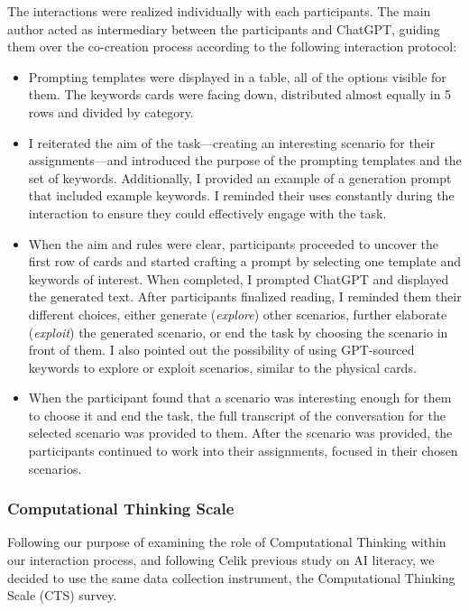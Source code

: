 \documentclass[sn-mathphys, Numbered]{sn-jnl}%
\theoremstyle{thmstyleone}%
\theoremstyle{thmstyletwo}%
\theoremstyle{thmstylethree}%
\begin{document}
The interactions were realized individually with each participants. The main author acted as intermediary between the participants and ChatGPT, guiding them over the co-creation process according to the following interaction protocol:
    \begin{itemize}

        \item  Prompting templates were displayed in a table, all of the options visible for them. The keywords cards were facing down, distributed almost equally in 5 rows and divided by category.
        \item I reiterated the aim of the task---creating an interesting scenario for their assignments---and introduced the purpose of the prompting templates and the set of keywords. Additionally, I provided an example of a generation prompt that included example keywords. I reminded their uses constantly during the interaction to ensure they could effectively engage with the task.
        \item When the aim and rules were clear, participants proceeded to uncover the first row of cards and started crafting a prompt by selecting one template and keywords of interest. When completed, I prompted ChatGPT and displayed the generated text. After participants finalized reading, I reminded them their different choices, either generate (\textit{explore}) other scenarios, further elaborate (\textit{exploit}) the generated scenario, or end the task by choosing the scenario in front of them. I also pointed out the possibility of using GPT-sourced keywords to explore or exploit scenarios, similar to the physical cards.
        \item When the participant found that a scenario was interesting enough for them to choose it and end the task, the full transcript of the conversation for the selected scenario was provided to them. After the scenario was provided, the participants continued to work into their assignments, focused in their chosen scenarios.
    \end{itemize}


\subsubsection*{Computational Thinking Scale}

Following our purpose of examining the role of Computational Thinking within our interaction process, and following Celik \parencite*{celik_exploring_2023} previous study on AI literacy, we decided to use the same data collection instrument, the Computational Thinking Scale (CTS) survey.
\end{document}
